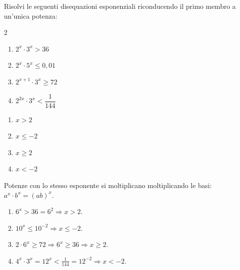 
\begin{question}[ID=5.14, subtitle={Disequazioni con prodotto di potenze di basi diverse}, difficulty=difficile, tags={disequazioni, esponenziali, basi diverse}]
Risolvi le seguenti disequazioni esponenziali riconducendo il primo membro a un'unica potenza:
\begin{center}\begin{minipage}{0.92\linewidth}
\begin{multicols}{2}
\begin{enumerate}[leftmargin=3.2cm]
\item $2^{x} \cdot 3^{x} > 36$
\item $2^{x} \cdot 5^{x} \leq 0{,}01$
\item $2^{x+1} \cdot 3^{x} \geq 72$
\item $2^{2x} \cdot 3^{x} < \dfrac{1}{144}$
\end{enumerate}
\end{multicols}
\end{minipage}\end{center}
\begin{solution}
\begin{enumerate}
    \item $x>2$
    \item $x\leq-2$
    \item $x\geq2$
    \item $x<-2$
\end{enumerate}
\end{solution}
\begin{explanation}
Potenze con lo stesso esponente si moltiplicano moltiplicando le basi: $a^x\cdot b^x=(ab)^x$.
\begin{enumerate}
    \item $6^x>36=6^2 \Rightarrow x>2$.
    \item $10^x\leq10^{-2} \Rightarrow x\leq-2$.
    \item $2\cdot6^x\geq72 \Rightarrow 6^x\geq36 \Rightarrow x\geq2$.
    \item $4^x\cdot3^x=12^x<\tfrac1{144}=12^{-2} \Rightarrow x<-2$.
\end{enumerate}
\end{explanation}
\end{question}


